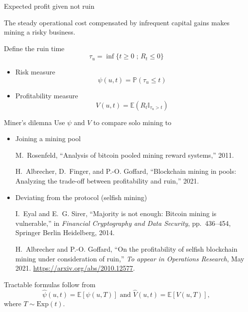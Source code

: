 \documentclass{beamer}
\begin{document}
\begin{frame}{Expected profit given not ruin}
\scriptsize

\begin{tcolorbox}[enhanced,drop shadow, title=Fact]
The steady operational cost compensated by infrequent capital gains makes mining a risky business.
\end{tcolorbox}
Define the ruin time 
$$
\tau_u  = \inf\{t\geq0\text{ ; }R_t \leq0\}
$$
\begin{itemize}
  \item Risk measure 
  $$
  \psi(u,t) = \mathbb{P}(\tau_u \leq t)
  $$
  \item Profitability measure
  $$
  V(u,t) = \mathbb{E}(R_t\mathbb{I}_{\tau_u > t})
  $$
\end{itemize} 
\end{frame}
\begin{frame}{Miner's dilemna} 
\scriptsize
Use $\psi$ and $V$ to compare solo mining to
\begin{itemize}
  \item Joining a mining pool
\tiny
  \begin{thebibliography}{1}

M.~Rosenfeld, ``Analysis of bitcoin pooled mining reward systems,'' 2011.

H.~Albrecher, D.~Finger, and P.-O. Goffard, ``Blockchain mining in pools:
  Analyzing the trade-off between profitability and ruin,'' 2021.


\end{thebibliography}
  \item \scriptsize Deviating from the protocol (selfish mining)

  \tiny
  \begin{thebibliography}{1}
I.~Eyal and E.~G. Sirer, ``Majority is not enough: Bitcoin mining is
  vulnerable,'' in {\em Financial Cryptography and Data Security},
  pp.~436--454, Springer Berlin Heidelberg, 2014.

H.~Albrecher and P.-O. Goffard, ``{On the profitability of selfish blockchain
  mining under consideration of ruin},'' {\em To appear in Operations
  Research}, May 2021.
\newblock \url{https://arxiv.org/abs/2010.12577}.
\end{thebibliography}
\end{itemize}
Tractable formulas follow from 
$$
\widehat{\psi}(u,t)= \mathbb{E}[\psi(u,T)]\text{ and }\widehat{V}(u,t)= \mathbb{E}[V(u,T)],
$$
where $T\sim\text{Exp}(t)$.
\end{frame}
\end{document}
